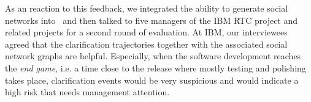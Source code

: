 As an reaction to this feedback, we integrated the ability to generate social networks into \viss\ and then  talked to five managers of the IBM RTC project and related projects for a second round of evaluation.
At IBM, our interviewees agreed that the clarification trajectories together with the associated social network graphs are helpful. 
Especially, when the software development reaches the \emph{end game}, i.e. a time close to the release where mostly testing and polishing takes place, clarification events would be very suspicious and would indicate a high risk that needs management attention. 
